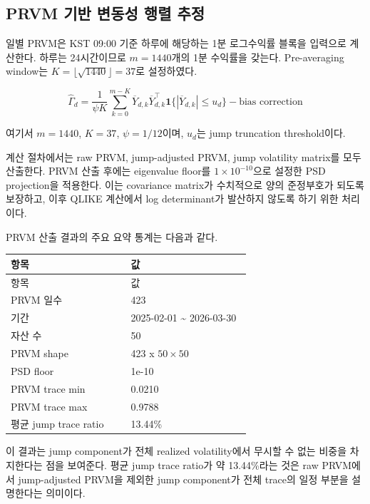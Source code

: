 \documentclass[12pt,a4paper]{article}
\begin{document}

\subsection{PRVM 기반 변동성 행렬 추정}

일별 PRVM은 KST 09:00 기준 하루에 해당하는 1분 로그수익률 블록을 입력으로 계산한다. 하루는 24시간이므로 $m=1440$개의 1분 수익률을 갖는다. Pre-averaging window는 $K=\lfloor\sqrt{1440}\rfloor=37$로 설정하였다.


\[
\widehat{\Gamma}_d =
\frac{1}{\psi K}
\sum_{k=0}^{m-K}
\overline{Y}_{d,k}\overline{Y}_{d,k}^{\top}
\mathbf{1}\{|\overline{Y}_{d,k}| \le u_d\}
- \text{bias correction}
\]

여기서 $m=1440$, $K=37$, $\psi=1/12$이며, $u_d$는 jump truncation threshold이다.

계산 절차에서는 raw PRVM, jump-adjusted PRVM, jump volatility matrix를 모두 산출한다. PRVM 산출 후에는 eigenvalue floor를 $1\times 10^{-10}$으로 설정한 PSD projection을 적용한다. 이는 covariance matrix가 수치적으로 양의 준정부호가 되도록 보장하고, 이후 QLIKE 계산에서 log determinant가 발산하지 않도록 하기 위한 처리이다.

PRVM 산출 결과의 주요 요약 통계는 다음과 같다.

\begin{center}
\small
\begin{longtable}{@{}p{0.48\linewidth}p{0.48\linewidth}@{}}
\toprule
항목 & 값 \\
\midrule
\endfirsthead
\toprule
항목 & 값 \\
\midrule
\endhead
PRVM 일수 & 423 \\
기간 & 2025-02-01 \textasciitilde{} 2026-03-30 \\
자산 수 & 50 \\
PRVM shape & 423 x $50 \times 50$ \\
PSD floor & 1e-10 \\
PRVM trace min & 0.0210 \\
PRVM trace max & 0.9788 \\
평균 jump trace ratio & 13.44\% \\
\bottomrule
\end{longtable}
\end{center}

이 결과는 jump component가 전체 realized volatility에서 무시할 수 없는 비중을 차지한다는 점을 보여준다. 평균 jump trace ratio가 약 13.44\%라는 것은 raw PRVM에서 jump-adjusted PRVM을 제외한 jump component가 전체 trace의 일정 부분을 설명한다는 의미이다.
\end{document}
